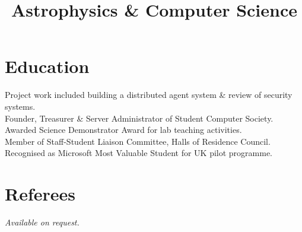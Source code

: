 \documentclass{resume}
\begin{document}
\begin{resume}
\section{Education}

\title{\bf Astrophysics \& Computer Science}
\begin{position}
Project work included building a distributed agent system \& review of security systems.\vspace{1mm}\\
Founder, Treasurer \& Server Administrator of Student Computer Society.\vspace{1mm}\\
Awarded Science Demonstrator Award for lab teaching activities.\vspace{1mm}\\
Member of Staff-Student Liaison Committee, Halls of Residence Council.\vspace{1mm}\\
Recognised as Microsoft Most Valuable Student for UK pilot programme.
\end{position}

\section{Referees} 
\textsl{Available on request.}

\end{resume}
\end{document}

